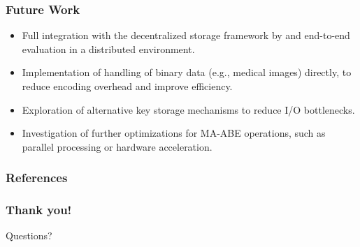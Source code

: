 \documentclass{beamer}
\begin{document}
\begin{frame}
    \frametitle{Future Work}
    \begin{itemize}
        \item Full integration with the decentralized storage framework by  and end-to-end evaluation in a distributed environment.
        \item Implementation of handling of binary data (e.g., medical images) directly, to reduce encoding overhead and improve efficiency.
        \item Exploration of alternative key storage mechanisms to reduce I/O bottlenecks.
        \item Investigation of further optimizations for MA-ABE operations, such as parallel processing or hardware acceleration.
    \end{itemize}
\end{frame}

\begin{frame}[allowframebreaks]
    \frametitle{References}
    
\end{frame}

\begin{frame}
    \frametitle{Thank you!}
    \begin{center}
        \Large Questions?
    \end{center}
    \vspace{2cm}
    \InfContacts
\end{frame}
\end{document}
